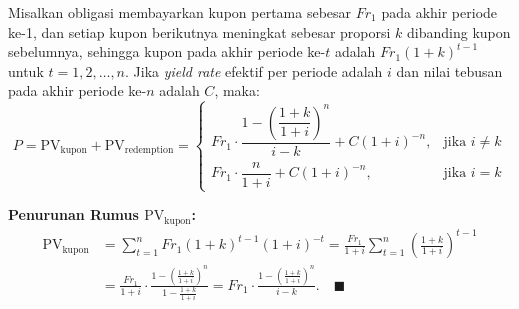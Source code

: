 \documentclass[11pt,a4paper]{article}
\begin{document}
\begin{theorembox}
Misalkan obligasi membayarkan kupon pertama sebesar $Fr_1$ pada akhir periode ke-1, dan setiap kupon berikutnya meningkat sebesar proporsi $k$ dibanding kupon sebelumnya, sehingga kupon pada akhir periode ke-$t$ adalah $Fr_1(1+k)^{t-1}$ untuk $t = 1, 2, \dots, n$. Jika \textit{yield rate} efektif per periode adalah $i$ dan nilai tebusan pada akhir periode ke-$n$ adalah $C$, maka:
\begin{equation}
    P = \text{PV}_{\text{kupon}} + \text{PV}_{\text{redemption}} = \begin{cases}
        Fr_1 \cdot \dfrac{1 - \left(\dfrac{1+k}{1+i}\right)^n}{i - k} + C(1+i)^{-n}, & \text{jika } i \neq k \\[1.2em]
        Fr_1 \cdot \dfrac{n}{1 + i} + C(1+i)^{-n}, & \text{jika } i = k
    \end{cases}
\end{equation}
\end{theorembox}

\noindent\textbf{Penurunan Rumus $\text{PV}_{\text{kupon}}$:}
\begin{align*}
    \text{PV}_{\text{kupon}} &= \sum_{t=1}^n Fr_1(1+k)^{t-1}(1+i)^{-t} = \frac{Fr_1}{1+i} \sum_{t=1}^n \left(\frac{1+k}{1+i}\right)^{t-1} \\
    &= \frac{Fr_1}{1+i} \cdot \frac{1 - \left(\frac{1+k}{1+i}\right)^n}{1 - \frac{1+k}{1+i}} = Fr_1 \cdot \frac{1 - \left(\frac{1+k}{1+i}\right)^n}{i - k}. \quad \blacksquare
\end{align*}
\end{document}
